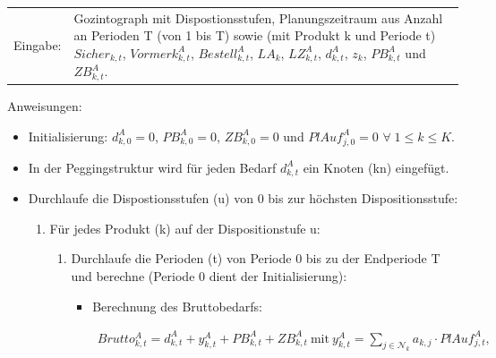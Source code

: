\vspace{\baselineskip} 


\begin{algorithmic}
    \label{algo:Algorithmus_MRP}
    \STATE 
    \begin{tabularx}{\linewidth}{p{1.5 cm}X}
        Eingabe: &  Gozintograph mit Dispostionsstufen, Planungszeitraum aus Anzahl an Perioden T (von 1 bis T) sowie (mit Produkt k und Periode t) $Sicher_{k,t}$, $Vormerk^{A}_{k,t}$, $Bestell^{A}_{k,t}$, $LA_{k}$, $LZ^{A}_{k,t}$, $d^{A}_{k,t}$, $z_{k}$, $PB^{A}_{k,t}$ und $ZB^{A}_{k,t}$. 	
    \end{tabularx} 
    \addtocounter{table}{-1} %
    
    \hspace*{0,4cm}Anweisungen: \\	
    \begin{itemize} [leftmargin=*]
        \item 
        Initialisierung: $d^{A}_{k,0} = 0$, $PB^{A}_{k,0} = 0$, $ZB^{A}_{k,0} = 0$ und $PlAuf^{A}_{j,0} = 0$ $\forall\; 1 \le k \le K$. \\
        
        \item In der Peggingstruktur wird für jeden Bedarf $d^{A}_{k,t}$ ein Knoten (kn) eingefügt. \\
        
        \item
        Durchlaufe die Dispostionsstufen (u) von 0 bis zur höchsten Dispositionsstufe: 
        \begin{enumerate} [leftmargin=1.5em, label=]
            \item
            Für jedes Produkt (k) auf der Dispositionstufe u:
            \begin{enumerate} [leftmargin=*, label= \arabic*.]
                \item
                Durchlaufe die Perioden (t) von Periode 0 bis zu der Endperiode T und berechne (Periode 0 dient der Initialisierung):
                \begin{itemize} [leftmargin=*]
                    \item Berechnung des Bruttobedarfs:
                    \begin{fleqn}
                        \begin{align*}
                        Brutto^{A}_{k,t} = d^{A}_{k,t} + y^{A}_{k,t} + PB^{A}_{k,t} + ZB^{A}_{k,t} ~\text{mit} ~ y^{A}_{k,t} = \sum_{j \in \mathcal{N}_{k}} a_{k,j} \cdot PlAuf^{A}_{j,t}\text{,}
                        \end{align*}
                    \end{fleqn}
                    

\end{itemize}
\end{enumerate}
\end{enumerate}
\end{itemize}
\end{algorithmic}
